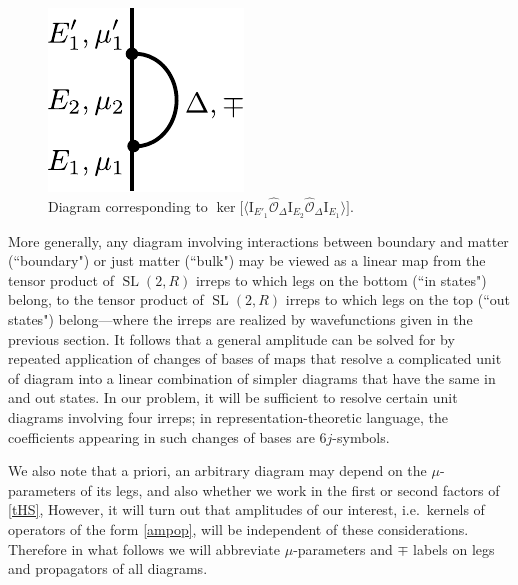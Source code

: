 \documentclass[12pt]{article}
\newcommand{\blangle}{\bigl\langle}
\newcommand{\brangle}{\bigr\rangle}
\newcommand*{\bcorr}[1]{\blangle{#1}\brangle}
\newcommand{\calO}{\mathcal{O}}
\newcommand{\RR}{\mathbb{R}}
\DeclareMathOperator{\tSL}{\widetilde{\mathrm{SL}}}
\newcommand{\Iota}{\mathrm{I}}
\newcommand{\De}{\Delta}
\def\ie{i.e.\ }
\def\widetilde#1{#1}%
\def\RR{R}
\begin{document}
\begin{figure}[t]
\centerline{
\includegraphics[scale=1]{reabsorb_long}
}

\caption{Diagram corresponding to $\ker\big[\bcorr{\Iota_{E'_1}\hat{\calO}_{\De}\Iota_{E_2}\hat{\calO}_{\De} \Iota_{E_1}}\big]$. }
\label{fig:reabsorb}
\end{figure}



More generally, any diagram involving interactions between boundary and matter (``boundary") or just matter (``bulk") may be viewed as a linear map from the tensor product of $\tSL(2,\RR)$ irreps to which legs on the bottom  (``in states") belong, to the tensor product of $\tSL(2,\RR)$ irreps to which legs on the top (``out states") belong---where the irreps are realized by wavefunctions given in the previous section. It follows that a general amplitude can be solved for by repeated application of changes of bases of maps that resolve a complicated unit of diagram into a linear combination of simpler diagrams that have the same in and out states. In our problem, it will be sufficient to resolve certain unit diagrams involving four irreps; in representation-theoretic language, the coefficients appearing in such changes of bases are $6j$-symbols. 

We also note that a priori, an arbitrary diagram may depend on the $\mu$-parameters of its legs, and also whether we work in the first or second factors of \eqref{tHS}, However, it will turn out that amplitudes of our interest, \ie kernels of operators of the form \eqref{ampop}, will be independent of these considerations. Therefore in what follows we will abbreviate $\mu$-parameters and $\mp$ labels on legs and propagators of all diagrams.
\end{document}
